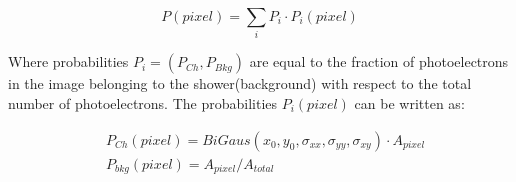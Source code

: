 \documentclass[main.tex]{subfiles}
\begin{document}
\begin{equation}
P(pixel) = \sum_{i} P_i \cdot P_i(pixel)
\end{equation}

Where probabilities $P_i=(P_{Ch}, P_{Bkg})$ are equal to the fraction of photoelectrons in the image belonging to the shower(background) with respect to the total number of photoelectrons. The probabilities $P_i(pixel)$ can be written as:

\begin{equation}
  \begin{split}
  & P_{Ch}(pixel) = BiGaus(x_{0}, y_{0},\sigma_{xx}, \sigma_{yy}, \sigma_{xy}) \cdot A_{pixel}\\
  & P_{bkg}(pixel) = A_{pixel}/A_{total}
  \end{split}
\end{equation}
\end{document}
